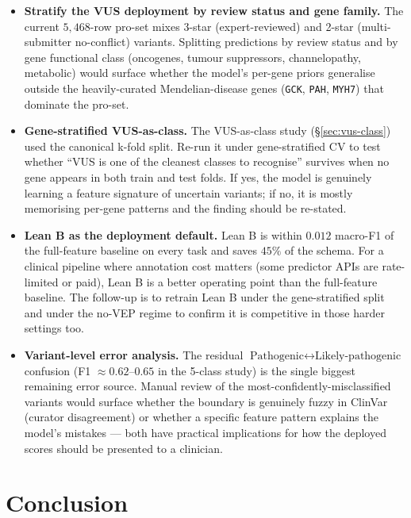 \documentclass[11pt,a4paper]{article}
\begin{document}
\begin{itemize}[leftmargin=*]
    \item \textbf{Stratify the VUS deployment by review status and gene
          family.} The current $5{,}468$-row pro-set mixes 3-star
          (expert-reviewed) and 2-star (multi-submitter no-conflict)
          variants. Splitting predictions by review status and by gene
          functional class (oncogenes, tumour suppressors, channelopathy,
          metabolic) would surface whether the model's per-gene priors
          generalise outside the heavily-curated Mendelian-disease genes
          (\texttt{GCK}, \texttt{PAH}, \texttt{MYH7}) that dominate the
          pro-set.
    \item \textbf{Gene-stratified VUS-as-class.} The VUS-as-class study
          (\S\ref{sec:vus-class}) used the canonical k-fold split. Re-run
          it under gene-stratified CV to test whether ``VUS is one of the
          cleanest classes to recognise'' survives when no gene appears
          in both train and test folds. If yes, the model is genuinely
          learning a feature signature of uncertain variants; if no, it
          is mostly memorising per-gene patterns and the finding should
          be re-stated.
    \item \textbf{Lean B as the deployment default.} Lean B is within
          $0.012$ macro-F1 of the full-feature baseline on every task
          and saves $45\%$ of the schema. For a clinical pipeline where
          annotation cost matters (some predictor APIs are rate-limited
          or paid), Lean B is a better operating point than the
          full-feature baseline. The follow-up is to retrain Lean B
          under the gene-stratified split and under the no-VEP regime to
          confirm it is competitive in those harder settings too.
    \item \textbf{Variant-level error analysis.} The residual
          $\text{Pathogenic} \leftrightarrow \text{Likely-pathogenic}$
          confusion (F1 $\approx 0.62$--$0.65$ in the 5-class study)
          is the single biggest remaining error source. Manual review
          of the most-confidently-misclassified variants would surface
          whether the boundary is genuinely fuzzy in ClinVar (curator
          disagreement) or whether a specific feature pattern explains
          the model's mistakes — both have practical implications for
          how the deployed scores should be presented to a clinician.
\end{itemize}

\section{Conclusion}
\end{document}
